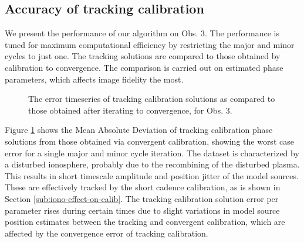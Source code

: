 \documentclass{aa}
\begin{document}
\subsection{Accuracy of tracking calibration}
We present the performance of our  algorithm on Obs. 3. The performance is tuned
for maximum computational  efficiency by restricting the major  and minor cycles
to  just  one.  The  tracking  solutions  are  compared  to  those  obtained  by
calibration to  convergence.  The  comparison is carried  out on  estimated phase parameters, which affects image fidelity the most.
\begin{figure}[tbh]

\caption{\label{fig:The-error-timeseries}The error timeseries of tracking
calibration solutions as compared to those obtained after iterating
to convergence, for Obs. 3.}
\end{figure}

Figure  \ref{fig:The-error-timeseries}  shows  the  Mean Absolute  Deviation  of
tracking  calibration  phase  solutions   from  those  obtained  via  convergent
calibration, showing  the worst case  error for a  single major and  minor cycle
iteration. The dataset is characterized  by a disturbed ionosphere, probably due
to  the recombining of  the disturbed  plasma. This  results in  short timescale
amplitude  and position  jitter of  the  model sources.   These are  effectively
tracked   by  the   short  cadence   calibration,   as  is   shown  in   Section
\ref{sub:iono-effect-on-calib}.   The tracking  calibration  solution error  per
parameter rises  during certain times due  to slight variations  in model source
position estimates  between the tracking  and convergent calibration,  which are
affected by the convergence error of tracking calibration.
\end{document}

